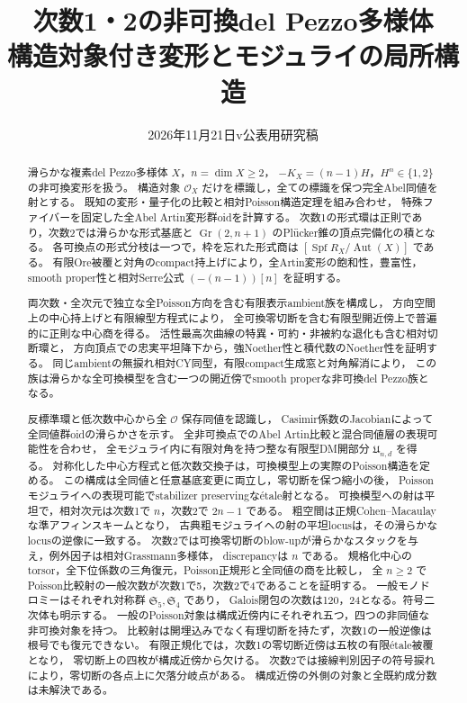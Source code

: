 \documentclass[a4paper,11pt]{ltjsarticle}
\title{次数1・2の非可換del Pezzo多様体\texorpdfstring{\\}{ }構造対象付き変形とモジュライの局所構造}
\author{}
\date{2026年11月21日\quad v\Version\quad 公表用研究稿}
\numberwithin{equation}{section}
\theoremstyle{plain}
\theoremstyle{definition}
\theoremstyle{remark}
\newcommand{\OO}{\mathcal O}
\newcommand{\Gr}{\operatorname{Gr}}
\begin{document}
\maketitle
\begin{abstract}
滑らかな複素del Pezzo多様体 $X$，$n=\dim X\ge2$，
$-K_X=(n-1)H$，$H^n\in\{1,2\}$ の非可換変形を扱う。
構造対象 $\OO_X$ だけを標識し，全ての標識を保つ完全Abel同値を射とする。
既知の変形・量子化の比較と相対Poisson構造定理を組み合わせ，
特殊ファイバーを固定した全Abel Artin変形群oidを計算する。
次数1の形式環は正則であり，次数2では滑らかな形式基底と
$\Gr(2,n+1)$ のPl\"ucker錐の頂点完備化の積となる。
各可換点の形式分枝は一つで，枠を忘れた形式商は
$[\operatorname{Spf}R_X/\operatorname{Aut}(X)]$ である。
有限Ore被覆と対角のcompact持上げにより，全Artin変形の飽和性，豊富性，
smooth proper性と相対Serre公式 $(-(n-1))[n]$ を証明する。

両次数・全次元で独立な全Poisson方向を含む有限表示ambient族を構成し，
方向空間上の中心持上げと有限線型方程式により，
全可換零切断を含む有限型開近傍上で普遍的に正則な中心商を得る。
活性最高次曲線の特異・可約・非被約な退化も含む相対切断環と，
方向頂点での忠実平坦降下から，強Noether性と積代数のNoether性を証明する。
同じambientの無捩れ相対CY同型，有限compact生成窓と対角解消により，
この族は滑らかな全可換模型を含む一つの開近傍でsmooth properな非可換del Pezzo族となる。

反標準環と低次数中心から全 $\mathcal O$ 保存同値を認識し，
Casimir係数のJacobianによって全同値群oidの滑らかさを示す。
全非可換点でのAbel Artin比較と混合同値層の表現可能性を合わせ，
全モジュライ内に有限対角を持つ整な有限型DM開部分 $\mathfrak U_{n,d}$ を得る。
対称化した中心方程式と低次数交換子は，可換模型上の実際のPoisson構造を定める。
この構成は全同値と任意基底変更に両立し，零切断を保つ縮小の後，
Poissonモジュライへの表現可能でstabilizer preservingな\'{e}tale射となる。
可換模型への射は平坦で，相対次元は次数1で $n$，次数2で $2n-1$ である。
粗空間は正規Cohen--Macaulayな準アフィンスキームとなり，
古典粗モジュライへの射の平坦locusは，その滑らかなlocusの逆像に一致する。
次数2では可換零切断のblow-upが滑らかなスタックを与え，例外因子は相対Grassmann多様体，
discrepancyは $n$ である。
規格化中心のtorsor，全下位係数の三角復元，Poisson正規形と全同値の商を比較し，
全 $n\ge2$ でPoisson比較射の一般次数が次数1で5，次数2で4であることを証明する。
一般モノドロミーはそれぞれ対称群 $\mathfrak S_5,\mathfrak S_4$ であり，
Galois閉包の次数は120，24となる。符号二次体も明示する。
一般のPoisson対象は構成近傍内にそれぞれ五つ，四つの非同値な非可換対象を持つ。
比較射は開埋込みでなく有理切断を持たず，次数1の一般逆像は根号でも復元できない。
有限正規化では，次数1の零切断近傍は五枚の有限\'{e}tale被覆となり，
零切断上の四枚が構成近傍から欠ける。
次数2では接線判別因子の符号捩れにより，零切断の各点上に欠落分岐点がある。
構成近傍の外側の対象と全既約成分数は未解決である。


\end{abstract}
\end{document}
